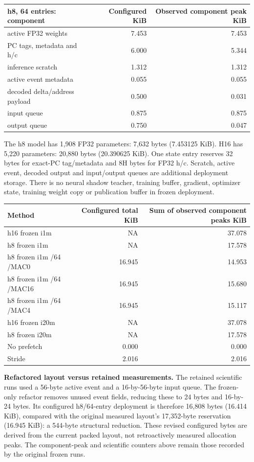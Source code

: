 \documentclass[10pt]{article}
\begin{document}
\begin{center}
\small
\begin{tabular}{lrr}
\toprule
h8, 64 entries: component & Configured KiB & Observed component peak KiB \\
\midrule
active FP32 weights & 7.453 & 7.453 \\
PC tags, metadata and h/c & 6.000 & 5.344 \\
inference scratch & 1.312 & 1.312 \\
active event metadata & 0.055 & 0.055 \\
decoded delta/address payload & 0.500 & 0.031 \\
input queue & 0.875 & 0.875 \\
output queue & 0.750 & 0.047 \\
\bottomrule
\end{tabular}
\end{center}

The h8 model has 1,908 FP32 parameters: 7,632 bytes (7.453125 KiB). H16 has 5,220 parameters: 20,880 bytes (20.390625 KiB). One state entry reserves 32 bytes for exact-PC tag/metadata and 8H bytes for FP32 h/c. Scratch, active event, decoded output and input/output queues are additional deployment storage. There is no neural shadow teacher, training buffer, gradient, optimizer state, training weight copy or publication buffer in frozen deployment.

\begin{center}
\scriptsize
\begin{tabular}{lrr}
\toprule
Method & Configured total KiB & Sum of observed component peaks KiB \\
\midrule
h16 frozen i1m & NA & 37.078 \\
h8 frozen i1m & NA & 17.578 \\
h8 frozen i1m /64 /MAC0 & 16.945 & 14.953 \\
h8 frozen i1m /64 /MAC16 & 16.945 & 15.680 \\
h8 frozen i1m /64 /MAC4 & 16.945 & 15.117 \\
h16 frozen i20m & NA & 37.078 \\
h8 frozen i20m & NA & 17.578 \\
No prefetch & 0.000 & 0.000 \\
Stride & 2.016 & 2.016 \\
\bottomrule
\end{tabular}
\end{center}

\textbf{Refactored layout versus retained measurements.} The retained scientific runs used a 56-byte active event and a 16-by-56-byte input queue. The frozen-only refactor removes unused event fields, reducing these to 24 bytes and 16-by-24 bytes. Its configured h8/64-entry deployment is therefore 16,808 bytes (16.414 KiB), compared with the original measured layout's 17,352-byte reservation (16.945 KiB): a 544-byte structural reduction. These revised configured bytes are derived from the current packed layout, not retroactively measured allocation peaks. The component-peak and scientific counters above remain those recorded by the original frozen runs.
\end{document}
